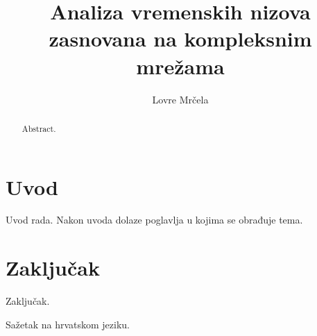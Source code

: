 \documentclass[times, utf8, diplomski]{fer}
\begin{document}

\title{Analiza vremenskih nizova zasnovana na kompleksnim mrežama}

\author{Lovre Mrčela}

\maketitle

\izvornik

\zahvala{}

\tableofcontents

\chapter{Uvod}
Uvod rada. Nakon uvoda dolaze poglavlja u kojima se obrađuje tema.

\chapter{Zaključak}
Zaključak.




\begin{sazetak}
Sažetak na hrvatskom jeziku.

\end{sazetak}

\begin{abstract}
Abstract.

\end{abstract}
\end{document}
